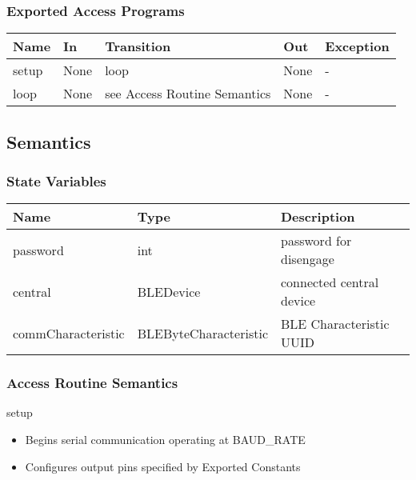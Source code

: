 \documentclass[12pt, titlepage]{article}
\begin{document}
\subsubsection{Exported Access Programs}

\begin{center}
\begin{tabular}{p{2cm} p{2cm} p{4cm} p{2cm} p{2cm}}
\hline
\textbf{Name} & \textbf{In} & \textbf{Transition} & \textbf{Out} & \textbf{Exception} \\
\hline
setup & None & loop & None & - \\
loop & None & see Access Routine Semantics & None & -\\
\hline
\end{tabular}
\end{center}

\subsection{Semantics}

\subsubsection{State Variables}

\begin{center}
\begin{tabular}{p{4cm} p{4cm} p{6cm}}
\hline
\textbf{Name} & \textbf{Type} & \textbf{Description} \\
\hline
password & int & password for disengage \\
central & BLEDevice & connected central device \\
commCharacteristic & BLEByteCharacteristic & BLE Characteristic UUID\\
\hline
\end{tabular}
\end{center}

\subsubsection{Access Routine Semantics}

\noindent setup
\begin{itemize}
\item Begins serial communication operating at BAUD\_RATE
\item Configures output pins specified by Exported Constants
\end{itemize}
\end{document}
